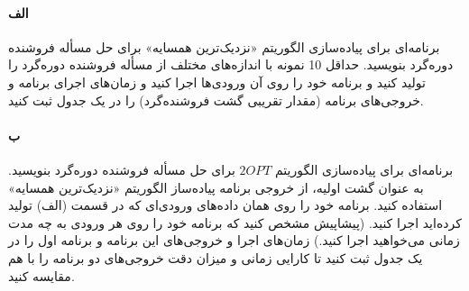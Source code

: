 \documentclass[]{article}
\begin{document}
\paragraph*{الف}
برنامه‌ای برای پیاده‌سازی الگوریتم «نزدیک‌ترین همسایه» برای حل مسأله فروشنده دوره‌گرد بنویسید.
حداقل 10 نمونه‌ با اندازه‌های مختلف از مسأله فروشنده دوره‌گرد را تولید کنید و برنامه خود را روی آن ورودی‌ها اجرا کنید
و زمان‌های اجرای برنامه و خروجی‌های برنامه (مقدار تقریبی گشت فروشنده‌گرد) را در یک جدول ثبت کنید.

\paragraph*{ب}
برنامه‌ای برای پیاده‌سازی الگوریتم $2OPT$ برای حل مسأله فروشنده دوره‌گرد بنویسید.
به عنوان گشت اولیه، از خروجی برنامه‌ پیاده‌ساز الگوریتم «نزدیک‌ترین همسایه» استفاده کنید.
برنامه خود را روی همان داده‌های ورودی‌ای که در قسمت (الف) تولید کرده‌اید اجرا کنید.
(پیشاپیش مشخص کنید که برنامه خود را روی هر ورودی به چه مدت زمانی می‌خواهید اجرا کنید.)
زمان‌های اجرا و خروجی‌های این برنامه و برنامه اول را در یک جدول ثبت کنید تا کارایی زمانی و میزان دقت خروجی‌های دو برنامه را با هم مقایسه کنید.
\end{document}
